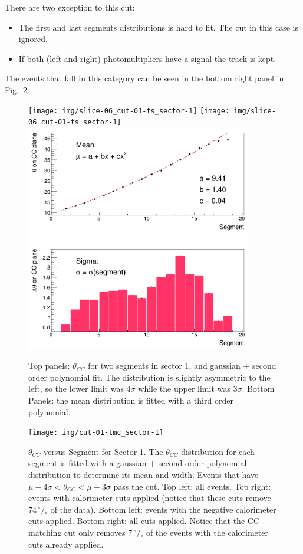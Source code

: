 There are two exception to this cut:
\begin{itemize}
    \item [1.] The first and last segments distributions is hard to fit. The cut in this case is ignored.
    \item [2.] If both (left and right) photomultipliers have a signal the track is kept.
\end{itemize}
The events that fall in this category can be seen in the bottom right panel in Fig.~\ref{fig:ccm_theta}.

\begin{figure}[ht]
    \vspace{-1cm}
    \centering
    \texttt{[image: img/slice-06\_cut-01-ts\_sector-1]}
    \texttt{[image: img/slice-06\_cut-01-ts\_sector-1]}
    \includegraphics[width=0.88\textwidth]{img/cut-01-tmp_sector-1}
    \caption{Top panels: $\theta_{CC}$ for two segments in sector 1, and gaussian + second order
    polynomial fit. The distribution is slightly asymmetric to the
    left, so the lower limit was $4\sigma$ while the upper limit
    was $3\sigma$.
    Bottom Panels: the mean distribution is fitted with a third order
    polynomial.  }
    \label{fig:ccm_slices}
\end{figure}


\begin{figure}[ht]
    \centering
    \texttt{[image: img/cut-01-tmc\_sector-1]}
    \caption{$\theta_{CC}$ versus Segment for Sector 1. The $\theta_{CC}$
        distribution for each segment is fitted with a gaussian +
        second order polynomial distribution to determine its mean
        and width. Events that have $\mu - 4\sigma < \theta_{CC} < \mu - 3\sigma$
        pass the cut.
        Top left: all events. Top right: events with calorimeter cuts applied
        (notice that these cuts remove $74 \,^{\circ\!\!}/\!_\circ$ of the data).
        Bottom left: events with the negative calorimeter cuts applied.
        Bottom right: all cuts applied. Notice that the CC matching cut
        only removes $7  \,^{\circ\!\!}/\!_\circ$ of the events with
        the calorimeter cuts already applied.}
    \label{fig:ccm_theta}
\end{figure}
